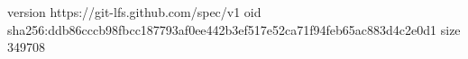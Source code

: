version https://git-lfs.github.com/spec/v1
oid sha256:ddb86cccb98fbcc187793af0ee442b3ef517e52ca71f94feb65ac883d4c2e0d1
size 349708
